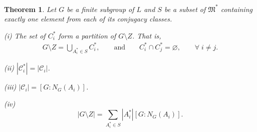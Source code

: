 \documentclass[a4paper , 11pt]{book}
\newtheorem{theorem}{Theorem}[chapter]
\theoremstyle{definition}
\theoremstyle{remark}
\begin{document}
\begin{theorem} \label{partitiontheorem} Let $G$ be a finite subgroup of $L$ and $S$ be a subset of $\mathfrak{M}^*$  containing exactly one element from each of its conjugacy classes. \vspace{2mm}

(i) The set of $C_i^*$ form a partition of $G \! \setminus \! Z$. That is,
\begin{align*} G \! \setminus \! Z = \bigcup\limits_{A_i^* \in S} C_i^*,  \qquad \text{and}  \qquad C_i^* \cap C_j^* = \varnothing, \qquad \forall \;  i \neq j.
\end{align*}

(ii) \: \! $|\mathcal{C}_i^*| = |\mathcal{C}_i|$. \vspace{4mm}

(iii) \: $|\mathcal{C}_i| = [G : N_G(A_i)]$. \vspace{4mm}

(iv) $$|G \! \setminus  \! Z| = \sum_{A_i^* \in S} |A_i^*| [G:N_G(A_i)].$$

\end{theorem}
\end{document}
